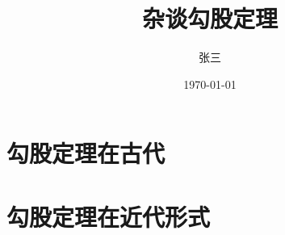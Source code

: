 \documentclass[UTF8]{ctexart}
\title{杂谈勾股定理}
\author{张三}
\date{\today}
\begin{document}
\maketitle
\tableofcontents

\section{勾股定理在古代}

\section{勾股定理在近代形式}


\end{document}
